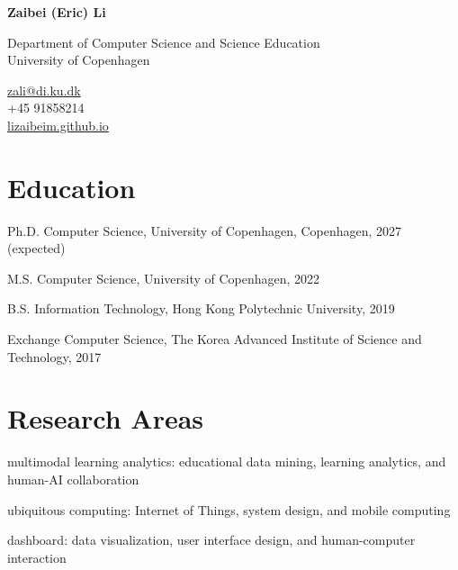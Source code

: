 \documentclass[11pt,letterpaper]{report}
\newcommand{\myname}{Zaibei (Eric) Li}
\newcommand{\namefont}[1]{{\normalfont\bfseries\Huge{#1}}}
\newcommand{\listitemspace}{0.25em}
\renewenvironment{itemize}
{\begin{list}{}{\setlength{\leftmargin}{0em}
                \setlength{\parskip}{0em}
                \setlength{\itemsep}{\listitemspace}
                \setlength{\parsep}{\listitemspace}}}
{\end{list}}
\begin{document}
    \raggedright{}

    \namefont{\myname}

    \vspace{1em}
    \begin{minipage}[t]{0.700\textwidth}
        Department of Computer Science and Science Education\\
        University of Copenhagen
    \end{minipage}
    \begin{minipage}[t]{0.295\textwidth}
        \flushright{}
        \href{mailto:zali@di.ku.dk}{zali@di.ku.dk} \\
        +45 91858214 \\
        \href{https://lizaibeim.github.io}{lizaibeim.github.io}
    \end{minipage}


    \section*{Education}

    \begin{tablist}

        \item[Ph.D.] \tab{}Computer Science, University of Copenhagen, Copenhagen, 2027 (expected)
        \item[M.S.]  \tab{}Computer Science, University of Copenhagen, 2022
        \item[B.S.]  \tab{}Information Technology, Hong Kong Polytechnic University, 2019
        \item[Exchange]  \tab{}Computer Science, The Korea Advanced Institute of Science and Technology, 2017

    \end{tablist}

    \section*{Research Areas}

    \begin{itemize}

        \item multimodal learning analytics: educational data mining, learning analytics, and human-AI collaboration
        \item ubiquitous computing: Internet of Things, system design, and mobile computing
        \item dashboard: data visualization, user interface design, and human-computer interaction

    \end{itemize}
\end{document}
